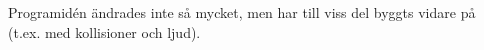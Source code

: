 Programidén ändrades inte så mycket,
men har till viss del byggts vidare på (t.ex. med kollisioner och ljud).

